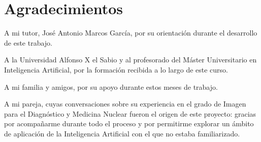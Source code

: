 \chapter*{Agradecimientos}

A mi tutor, José Antonio Marcos García, por su orientación durante el desarrollo de este trabajo.

A la Universidad Alfonso X el Sabio y al profesorado del Máster Universitario en Inteligencia
Artificial, por la formación recibida a lo largo de este curso.

A mi familia y amigos, por su apoyo durante estos meses de trabajo.

A mi pareja, cuyas conversaciones sobre su experiencia en el grado de Imagen para el Diagnóstico y
Medicina Nuclear fueron el origen de este proyecto: gracias por acompañarme durante todo el proceso
y por permitirme explorar un ámbito de aplicación de la Inteligencia Artificial con el que no estaba
familiarizado.
